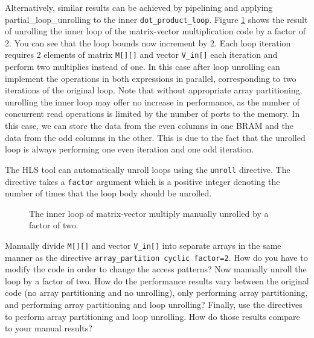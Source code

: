 Alternatively, similar results can be achieved by pipelining and applying \gls{partial_loop_unrolling} to the inner \lstinline|dot_product_loop|.   Figure \ref{fig:matrix_vector_unroll_inner2} shows the result of unrolling the inner loop of the matrix-vector multiplication code by a factor of 2. You can see that the loop bounds now increment by 2. Each loop iteration requires 2 elements of matrix \lstinline|M[][]| and vector \lstinline|V_in[]| each iteration and perform two multiplies instead of one. In this case after loop unrolling \VHLS can implement the operations in both expressions in parallel, corresponding to two iterations of the original loop. Note that without appropriate array partitioning, unrolling the inner loop may offer no increase in performance, as the number of concurrent read operations is limited by the number of ports to the memory.  In this case, we can store the data from the even columns in one BRAM and the data from the odd columns in the other. This is due to the fact that the unrolled loop is always performing one even iteration and one odd iteration. 

\begin{aside}
The HLS tool can automatically unroll loops using the \texttt{unroll} directive. The directive takes a \texttt{factor} argument which is a positive integer denoting the number of times that the loop body should be unrolled. 
\end{aside}

\begin{figure}

\caption{The inner loop of matrix-vector multiply manually unrolled by a factor of two. }
\label{fig:matrix_vector_unroll_inner2}
\end{figure}

\begin{exercise}
Manually divide \lstinline|M[][]| and vector \lstinline|V_in[]| into separate arrays in the same manner as the directive \lstinline|array_partition cyclic factor=2|. How do you have to modify the code in order to change the access patterns? Now manually unroll the loop by a factor of two. How do the performance results vary between the original code (no array partitioning and no unrolling), only performing array partitioning, and performing array partitioning and loop unrolling? Finally, use the directives to perform array partitioning and loop unrolling. How do those results compare to your manual results?
\end{exercise} 

